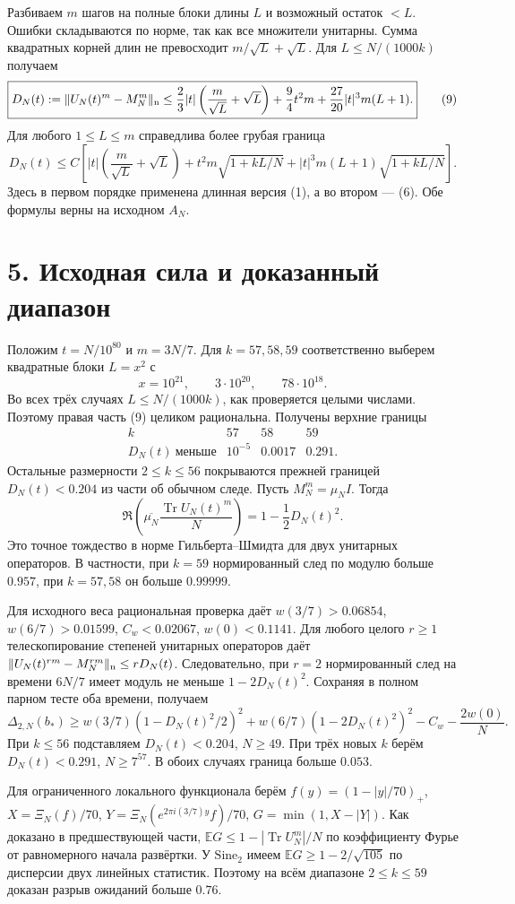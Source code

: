 \documentclass[11pt,a4paper]{article}
\newcommand{\Tr}{\operatorname{Tr}}
\newcommand{\EE}{\mathbb E}
\newcommand{\si}{\mathrm{Sine}_2}
\newcommand{\sect}[1]{\section*{\sffamily\color{ink}#1}}
\begin{document}
Разбиваем $m$ шагов на полные блоки длины $L$ и возможный остаток $<L$. Ошибки складываются по норме, так как все множители унитарны. Сумма квадратных корней длин не превосходит $m/\sqrt L+\sqrt L$. Для $L\le N/(1000k)$ получаем
\[
 \boxed{\displaystyle
 D_N(t):=\|U_N(t)^m-M_N^m\|_{\rm n}
   \le \frac23|t|\left(\frac m{\sqrt L}+\sqrt L\right)
         +\frac94 t^2 m+\frac{27}{20}|t|^3 m(L+1).}                 \tag{9}
\]
Для любого $1\le L\le m$ справедлива более грубая граница
\[
  D_N(t)\le C\left[
     |t|\left(\frac m{\sqrt L}+\sqrt L\right)
     +t^2m\sqrt{1+kL/N}
     +|t|^3m(L+1)\sqrt{1+kL/N}\right] .                              \tag{10}
\]
Здесь в первом порядке применена длинная версия (1), а во втором --- (6). Обе формулы верны на исходном $A_N$.
\newpage
\sect{5. Исходная сила и доказанный диапазон}
Положим $t=N/10^{80}$ и $m=3N/7$. Для $k=57,58,59$ соответственно выберем квадратные блоки $L=x^2$ с
\[
                 x=10^{21},\qquad 3\cdot10^{20},\qquad
                                      78\cdot10^{18}.
\]
Во всех трёх случаях $L\le N/(1000k)$, как проверяется целыми числами. Поэтому правая часть (9) целиком рациональна. Получены верхние границы
\[
\begin{array}{c|ccc}
 k&57&58&59\\ \hline
 D_N(t)\ \text{меньше}&10^{-5}&0.0017&0.291.
\end{array}
\]
Остальные размерности $2\le k\le56$ покрываются прежней границей $D_N(t)<0.204$ из части об обычном следе. Пусть $M_N^m=\mu_N I$. Тогда
\[
          \Re\!\left(\overline{\mu_N}\frac{\Tr U_N(t)^m}N\right)
                              =1-\frac12D_N(t)^2 .                 \tag{11}
\]
Это точное тождество в норме Гильберта--Шмидта для двух унитарных операторов. В частности, при $k=59$ нормированный след по модулю больше $0.957$, при $k=57,58$ он больше $0.99999$.

Для исходного веса рациональная проверка даёт $w(3/7)>0.06854$, $w(6/7)>0.01599$, $C_w<0.02067$, $w(0)<0.1141$. Для любого целого $r\ge1$ телескопирование степеней унитарных операторов даёт $\|U_N(t)^{rm}-M_N^{rm}\|_{\rm n}\le r D_N(t)$. Следовательно, при $r=2$ нормированный след на времени $6N/7$ имеет модуль не меньше $1-2D_N(t)^2$. Сохраняя в полном парном тесте оба времени, получаем
\[
 \Delta_{2,N}(b_*)\ge
 w(3/7)(1-D_N(t)^2/2)^2+
 w(6/7)(1-2D_N(t)^2)^2-C_w-\frac{2w(0)}{N}.
\]
При $k\le56$ подставляем $D_N(t)<0.204$, $N\ge49$. При трёх новых $k$ берём $D_N(t)<0.291$, $N\ge7^{57}$. В обоих случаях граница больше $0.053$.

Для ограниченного локального функционала берём $f(y)=(1-|y|/70)_+$, $X=\Xi_N(f)/70$, $Y=\Xi_N(e^{2\pi i (3/7)y}f)/70$, $G=\min(1,X-|Y|)$. Как доказано в предшествующей части, $\EE G\le1-|\Tr U_N^m|/N$ по коэффициенту Фурье от равномерного начала развёртки. У $\si$ имеем $\EE G\ge1-2/\sqrt{105}$ по дисперсии двух линейных статистик. Поэтому на всём диапазоне $2\le k\le59$ доказан разрыв ожиданий больше $0.76$.
\end{document}
